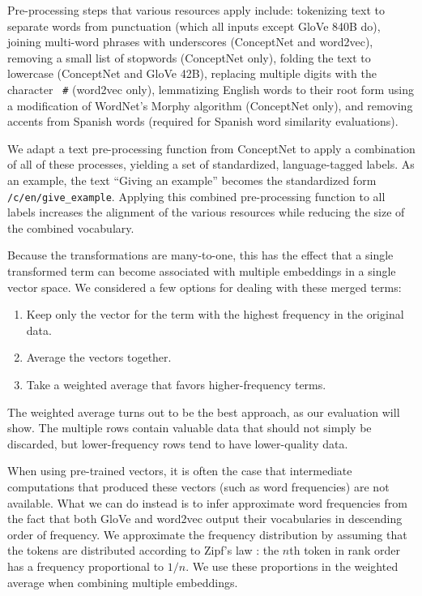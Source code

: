 \documentclass[11pt,letterpaper]{article}
\begin{document}

Pre-processing steps that various resources apply include: tokenizing text to
separate words from punctuation (which all inputs except GloVe 840B do),
joining multi-word phrases with underscores (ConceptNet and word2vec), removing
a small list of stopwords (ConceptNet only), folding the text to lowercase
(ConceptNet and GloVe 42B), replacing multiple digits with the character {\tt
\#} (word2vec only), lemmatizing English words to their root form using a
modification of WordNet's Morphy algorithm (ConceptNet only), and removing
accents from Spanish words (required for Spanish word similarity evaluations).

We adapt a text pre-processing function from ConceptNet to apply a combination
of all of these processes, yielding a set of standardized, language-tagged
labels. As an example, the text ``Giving an example'' becomes the standardized
form {\tt /c/en/give\_example}. Applying this combined pre-processing function
to all labels increases the alignment of the various resources while reducing
the size of the combined vocabulary.

Because the transformations are many-to-one, this has the effect that a single
transformed term can become associated with multiple embeddings in a single
vector space. We considered a few options for dealing with these merged terms:

\begin{enumerate}
\item Keep only the vector for the term with the highest frequency in the
    original data.
\item Average the vectors together.
\item Take a weighted average that favors higher-frequency terms.
\end{enumerate}

The weighted average turns out to be the best approach, as our evaluation will
show. The multiple rows contain valuable data that should not simply be
discarded, but lower-frequency rows tend to have lower-quality data.

When using pre-trained vectors, it is often the case that intermediate
computations that produced these vectors (such as word frequencies) are not
available. What we can do instead is to infer approximate word frequencies from
the fact that both GloVe and word2vec output their vocabularies in descending
order of frequency. We approximate the frequency distribution by assuming that
the tokens are distributed according to Zipf's law \cite{zipf1949human}: the
$n$th token in rank order has a frequency proportional to $1/n$. We use these
proportions in the weighted average when combining multiple embeddings.
\end{document}
